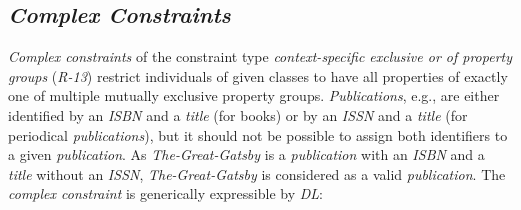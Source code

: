\documentclass[a4paper,fontsize=11pt]{scrartcl}
\newcommand{\ms}[1]{\texttt{#1}}
\newenvironment{DL}{
  \vspace{0cm}
	\begin{center}
  \begin{tabular}{r l}

}{
  \end{tabular}
	\end{center}
}
\begin{document}
\subsection{\emph{Complex Constraints}}

\emph{Complex constraints} of the constraint type \emph{context-specific exclusive or of property groups} (\emph{R-13}) 
restrict individuals of given classes to have all properties of exactly one of multiple mutually exclusive property groups.
\emph{Publications}, e.g., are either identified by an \emph{ISBN} and a \emph{title} (for books) or by an \emph{ISSN} and a \emph{title} (for periodical \emph{publications}), but it should not be possible to assign both identifiers to a given \emph{publication}. 
As \emph{The-Great-Gatsby} is a \emph{publication} with an \emph{ISBN} and a \emph{title} without an \emph{ISSN}, 
\emph{The-Great-Gatsby} is considered as a valid \emph{publication}.
The \emph{complex constraint} is generically expressible by \emph{DL}:






\end{document}
